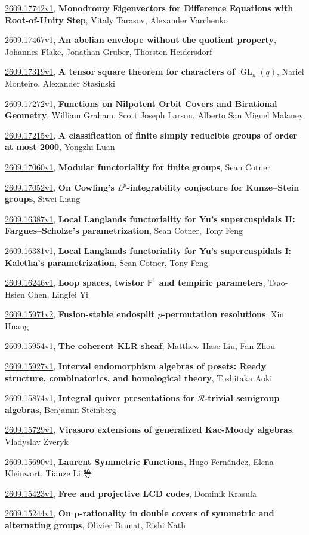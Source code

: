 \documentclass[9pt, a4paper]{article}
\theoremstyle{plain}
\theoremstyle{definition}
\theoremstyle{remark}
\newcommand{\arxiv}[3]{\href{https://arxiv.org/abs/#1}{#1}, \textbf{\textcolor{arxivblue}{#2}}, #3}
\begin{document}
\arxiv{2609.17742v1}{Monodromy Eigenvectors for Difference Equations with Root-of-Unity Step}{Vitaly Tarasov, Alexander Varchenko}

\arxiv{2609.17467v1}{An abelian envelope without the quotient property}{Johannes Flake, Jonathan Gruber, Thorsten Heidersdorf}

\arxiv{2609.17319v1}{A tensor square theorem for characters of $\operatorname{GL}_{n}(q)$}{Nariel Monteiro, Alexander Stasinski}

\arxiv{2609.17272v1}{Functions on Nilpotent Orbit Covers and Birational Geometry}{William Graham, Scott Joseph Larson, Alberto San Miguel Malaney}

\arxiv{2609.17215v1}{A classification of finite simply reducible groups of order at most 2000}{Yongzhi Luan}

\arxiv{2609.17060v1}{Modular functoriality for finite groups}{Sean Cotner}

\arxiv{2609.17052v1}{On Cowling's $L^p$-integrability conjecture for Kunze--Stein groups}{Siwei Liang}

\arxiv{2609.16387v1}{Local Langlands functoriality for Yu's supercuspidals II: Fargues--Scholze's parametrization}{Sean Cotner, Tony Feng}

\arxiv{2609.16381v1}{Local Langlands functoriality for Yu's supercuspidals I: Kaletha's parametrization}{Sean Cotner, Tony Feng}

\arxiv{2609.16246v1}{Loop spaces, twistor $\mathbb P^1$ and tempiric parameters}{Tsao-Hsien Chen, Lingfei Yi}

\arxiv{2609.15971v2}{Fusion-stable endosplit $p$-permutation resolutions}{Xin Huang}

\arxiv{2609.15954v1}{The coherent KLR sheaf}{Matthew Hase-Liu, Fan Zhou}

\arxiv{2609.15927v1}{Interval endomorphism algebras of posets: Reedy structure, combinatorics, and homological theory}{Toshitaka Aoki}

\arxiv{2609.15874v1}{Integral quiver presentations for $\mathscr R$-trivial semigroup algebras}{Benjamin Steinberg}

\arxiv{2609.15729v1}{Virasoro extensions of generalized Kac-Moody algebras}{Vladyslav Zveryk}

\arxiv{2609.15690v1}{Laurent Symmetric Functions}{Hugo Fernández, Elena Kleinwort, Tianze Li 等}

\arxiv{2609.15423v1}{Free and projective LCD codes}{Dominik Krasula}

\arxiv{2609.15244v1}{On $\boldsymbol{p}$-rationality in double covers of symmetric and alternating groups}{Olivier Brunat, Rishi Nath}
\end{document}
